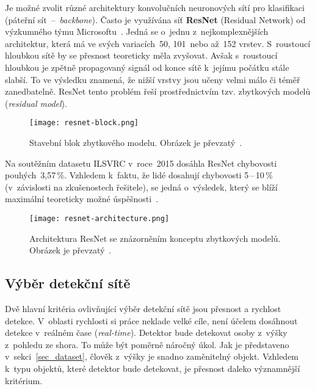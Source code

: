 Je možné zvolit různé architektury konvolučních neuronových sítí pro klasifikaci (páteřní sít~--~\textit{backbone}). Často je využívána síť \textbf{ResNet} (Residual Network) od výzkumného týmu Microsoftu~\cite{paperResnet}. Jedná se o~jednu z~nejkomplexnějších architektur, která má ve svých variacích~50, 101~nebo až~152 vrstev. S~roustoucí hloubkou sítě by se přesnost teoreticky měla zvyšovat. Avšak s~roustoucí hloubkou je zpětně propagovaný signál od konce sítě k~jejímu počátku stále slabší. To ve výsledku znamená, že nižší vrstvy jsou učeny velmi málo či téměř zanedbatelně. ResNet tento problém řeší prostřednictvím tzv. zbytkových modelů (\textit{residual model}).

\begin{figure}[H]
    \centering
    \texttt{[image: resnet-block.png]}
    \caption[Zbytkový ResNet model]{Stavební blok zbytkového modelu. Obrázek je převzatý~\cite{paperResnet}.}
    \label{fig_resnet_block}
\end{figure}

Na soutěžním datasetu ILSVRC v~roce~2015 dosáhla ResNet chybovosti pouhých~3,57\,\%. Vzhledem k~faktu, že lidé dosahují chybovosti 5\,--\,10\,\% (v~závislosti na zkušenostech řešitele), se jedná o~výsledek, který se blíží maximální teoreticky možné úspěšnosti~\cite{paperResnet}.

\begin{figure}[H]
    \centering
    \texttt{[image: resnet-architecture.png]}
    \caption[Architektura sítě ResNet]{Architektura ResNet se znázorněním konceptu zbytkových modelů. Obrázek je převzatý~\cite{paperResnet}.}
    \label{fig_resnet_architecture}
\end{figure}


\subsection*{Výběr detekční sítě}

Dvě hlavní kritéria ovlivňující výběr detekční sítě jsou přesnost a rychlost detekce. V~oblasti rychlosti si práce neklade velké cíle, není účelem dosáhnout detekce v~reálném čase (\textit{real-time}). Detektor bude detekovat osoby z~výšky z~pohledu ze shora. To může být poměrně náročný úkol. Jak je představeno v~sekci~\ref{sec_dataset}, člověk z~výšky je snadno zaměnitelný objekt. Vzhledem k~typu objektů, které detektor bude detekovat, je přesnost daleko významnější kritérium.

